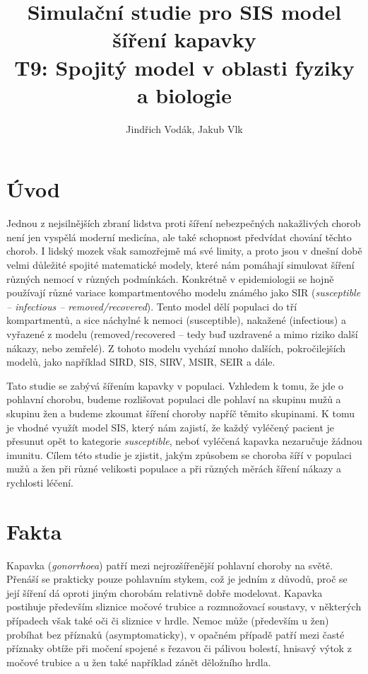 \documentclass{article}
\title{%
  Simulační studie pro SIS model šíření kapavky\\
  \large T9: Spojitý model v oblasti fyziky a biologie}
\author{Jindřich Vodák, Jakub Vlk}
\date{}
\begin{document}
\maketitle

\newpage
\tableofcontents
\newpage

\section{Úvod}
Jednou z nejsilnějších zbraní lidstva proti šíření nebezpečných nakažlivých chorob není jen vyspělá moderní medicína, ale také schopnost předvídat chování těchto chorob. I lidský mozek však samozřejmě má své limity, a proto jsou v dnešní době velmi důležité spojité matematické modely, které nám pomáhají simulovat šíření různých nemocí v různých podmínkách. Konkrétně v epidemiologii se hojně používají různé variace kompartmentového modelu známého jako SIR (\emph{susceptible -- infectious -- removed/recovered}). Tento model dělí populaci do tří kompartmentů, a sice náchylné k nemoci (susceptible), nakažené (infectious) a vyřazené z modelu (removed/recovered -- tedy buď uzdravené a mimo riziko další nákazy, nebo zemřelé). Z tohoto modelu vychází mnoho dalších, pokročilejších modelů, jako například SIRD, SIS, SIRV, MSIR, SEIR a dále.

Tato studie se zabývá šířením kapavky v populaci. Vzhledem k tomu, že jde o pohlavní chorobu, budeme rozlišovat populaci dle pohlaví na skupinu mužů a skupinu žen a budeme zkoumat šíření choroby napříč těmito skupinami. K tomu je vhodné využít model SIS, který nám zajistí, že každý vyléčený pacient je přesunut opět to kategorie \emph{susceptible}, neboť vyléčená kapavka nezaručuje žádnou imunitu. Cílem této studie je zjistit, jakým způsobem se choroba šíří v populaci mužů a žen při různé velikosti populace a při různých měrách šíření nákazy a rychlosti léčení.
\newpage

\section{Fakta}
Kapavka (\emph{gonorrhoea}) patří mezi nejrozšířenější pohlavní choroby na světě. Přenáší se prakticky pouze pohlavním stykem, což je jedním z důvodů, proč se její šíření dá oproti jiným chorobám relativně dobře modelovat. Kapavka postihuje především sliznice močové trubice a rozmnožovací soustavy, v některých případech však také oči či sliznice v hrdle. Nemoc může (především u žen) probíhat bez příznaků (asymptomaticky), v opačném případě patří mezi časté příznaky obtíže při močení spojené s řezavou či pálivou bolestí, hnisavý výtok z močové trubice a u žen také například zánět děložního hrdla.
\end{document}
